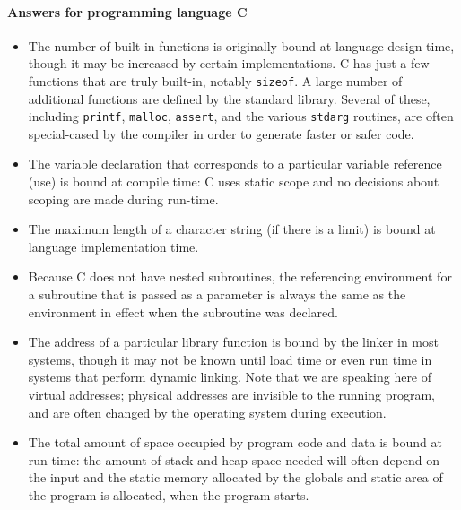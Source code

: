 \documentclass[5pt]{article}
\begin{document}
\paragraph{Answers for programming language C}
\begin{itemize}
\item The number of built-in functions is originally bound at language design
time, though it may be increased by certain implementations. C has just a few functions that are truly built-in,
notably \verb|sizeof|. A large number of additional functions are defined by the
standard library. Several of these, including \verb|printf|, \verb|malloc|,
\verb|assert|, and the various \verb|stdarg| routines, are often special-cased
by the compiler in order to generate faster or safer code. 

\item The variable declaration that corresponds to a particular variable
reference (use) is bound at compile time: C uses static scope and no
decisions about scoping are made during run-time.

\item The maximum length of a character string (if there is a limit) is bound at
language implementation time.

\item Because C does not have nested subroutines, the referencing environment
for a subroutine that is passed as a parameter is always the same as the environment in effect when the subroutine
was declared.
\item The address of a particular library function is bound by the linker in
most systems, though it may not be known until load time or even run time in systems that perform dynamic linking.
Note that we are speaking here of virtual addresses; physical addresses
are invisible to the running program, and are often changed by the operating system during
execution.
\item The total amount of space occupied by program code and data is bound at
run time: the amount of stack and heap space needed will often depend on the input and the
static memory allocated by the globals and static area of the program is
allocated, when the program starts.
\end{itemize}


\setcounter{subsection}{2}
\subsection{}
\end{document}
